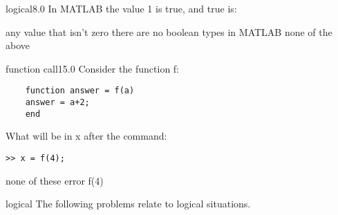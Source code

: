 \documentclass{exam}
\begin{document}


\begin{problem}{logical}{8.0}
In MATLAB the value 1 is true, and true is:
\begin{answers}
\answer[correct] any value that isn't zero %
\answer there are no boolean types in MATLAB
\answer[fixed] none of the above %
\end{answers}
\end{problem}
\begin{problem}{function call}{15.0}
Consider the function f:
  \begin{verbatim}
    function answer = f(a)
    answer = a+2;
    end
  \end{verbatim}
  What will be in x after the command:
  \begin{verbatim}>> x = f(4);
  \end{verbatim}
\begin{answers}
\answer[fixed] none of these %
\answer[fixed] error %
\answer f(4)
\end{answers}
\end{problem}
\begin{block}
\begin{block}{logical}
The following problems relate to logical situations.
\end{block}
\end{block}
\end{document}
